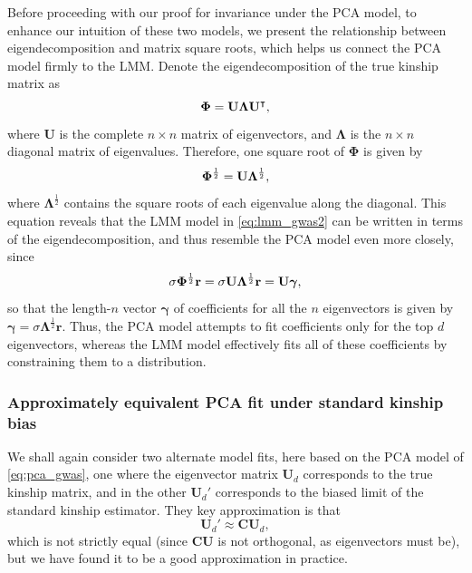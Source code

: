 \documentclass[11pt]{article}
\newcommand{\kinMat}{%
  \ensuremath{%
    \mathbf{\Phi}
  }%
  \xspace%
}%
\begin{document}
Before proceeding with our proof for invariance under the PCA model, to enhance our intuition of these two models, we present the relationship between eigendecomposition and matrix square roots, which helps us connect the PCA model firmly to the LMM.
Denote the eigendecomposition of the true kinship matrix as
$$
\kinMat = \mathbf{U} \mathbf{\Lambda} \mathbf{U}^\intercal,
$$
where $\mathbf{U}$ is the complete $n \times n$ matrix of eigenvectors, and
$\mathbf{\Lambda}$ is the $n \times n$ diagonal matrix of eigenvalues.
Therefore, one square root of \kinMat is given by
$$
\kinMat^\frac{1}{2}
=
\mathbf{U} \mathbf{\Lambda}^\frac{1}{2}
,
$$
where $\mathbf{\Lambda}^\frac{1}{2}$ contains the square roots of each eigenvalue along the diagonal.
This equation reveals that the LMM model in \cref{eq:lmm_gwas2} can be written in terms of the eigendecomposition, and thus resemble the PCA model even more closely, since
$$
\sigma \kinMat^\frac{1}{2} \mathbf{r}
=
\sigma \mathbf{U} \mathbf{\Lambda}^\frac{1}{2} \mathbf{r}
=
\mathbf{U} \boldsymbol{\gamma}
,
$$
so that the length-$n$ vector $\boldsymbol{\gamma}$ of coefficients for all the $n$ eigenvectors is given by
$
\boldsymbol{\gamma} = \sigma \mathbf{\Lambda}^\frac{1}{2} \mathbf{r}
$.
Thus, the PCA model attempts to fit coefficients only for the top $d$ eigenvectors, whereas the LMM model effectively fits all of these coefficients by constraining them to a distribution.

\subsubsection{Approximately equivalent PCA fit under standard kinship bias}

We shall again consider two alternate model fits, here based on the PCA model of \cref{eq:pca_gwas}, one where the eigenvector matrix $\mathbf{U}_d$ corresponds to the true kinship matrix, and in the other $\mathbf{U}_d'$ corresponds to the biased limit of the standard kinship estimator.
They key approximation is that
$$
\mathbf{U}_d' \approx \mathbf{C} \mathbf{U}_d,
$$
which is not strictly equal (since $\mathbf{C} \mathbf{U}$ is not orthogonal, as eigenvectors must be), but we have found it to be a good approximation in practice.
\end{document}
